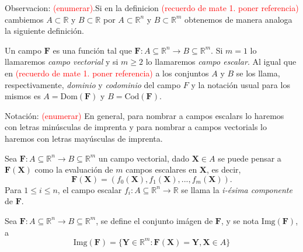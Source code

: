 

Observacion: \textcolor{red}{(enumerar)}.Si en la definicion \textcolor{red}{(recuerdo de mate 1. poner referencia)} cambiemos  $A \subset \mathbb{R}$ y $B \subset \mathbb{R}$ por $A \subset \mathbb{R}^{n}$ y $B \subset \mathbb{R}^{m}$  obtenemos de manera analoga la siguiente definici\'on.    



\begin{definition} Un campo $\mathbf{F}$ es una funci\'on  tal que
    $\mathbf{F}:A\subseteq \mathbb{R}^n \rightarrow B \subseteq \mathbb{R}^m.$   Si $m=1$ lo llamaremos  \textit{ campo vectorial }  y  si  $m\geq 2$ lo llamaremos   \textit{ campo escalar}. Al igual que en  \textcolor{red}{(recuerdo de mate 1. poner referencia)} a los conjuntos $A$ y $B$  se los llama, respectivamente, \textit{dominio}  y \textit{codominio} del campo $F$ y  la notaci\'on usual para los mismos  es  $A=\text{Dom}( \mathbf{F})$ y $B=\text{Cod}( \mathbf{F})$.   
  \end{definition}
  
  
  
  Notaci\'on:  \textcolor{red}{(enumerar)}  En general,  para nombrar a   campos escalars lo haremos con  letras minúsculas de imprenta y para nombrar a   campos vectorials lo haremos con  letras mayúsculas de imprenta.
  
  \begin{definition}
  Sea   $\mathbf{F}:A\subseteq \mathbb{R}^n \rightarrow B \subseteq \mathbb{R}^m$   un campo vectorial, dado $\boldsymbol{X} \in A$ se puede pensar a  $\mathbf{F}(\boldsymbol{X})$   como la evaluación de $m$ campos escalares en $\boldsymbol{X}$, 
    es decir,
    \begin{equation*}
        \mathbf{F}(\boldsymbol{X})=(f_0(\boldsymbol{X}), f_1(\boldsymbol{X}),..., f_m(\boldsymbol{X})).
    \end{equation*}
  Para $1 \leq i \leq n$,  el campo escalar $f_i: A\subseteq \mathbb{R}^n \rightarrow  \mathbb{R}$ se llama la \textit{i-\'esima componente} de $\mathbf{F}.$
 \end{definition}
  
  
  \begin{definition}
    Sea  $\mathbf{F}:A\subseteq \mathbb{R}^n \rightarrow B \subseteq \mathbb{R}^m$, se define el conjunto im\'agen de $\mathbf{F}$, y se nota $ \text{Img}(\mathbf{F})$, a 
    \begin{equation*}
        \text{Img}(\mathbf{F})=\{\boldsymbol{Y}\in\mathbb{R}^m: \mathbf{F}(\boldsymbol{X})=\boldsymbol{Y}, \boldsymbol{X} \in A\}
    \end{equation*}
  \end{definition}
  
